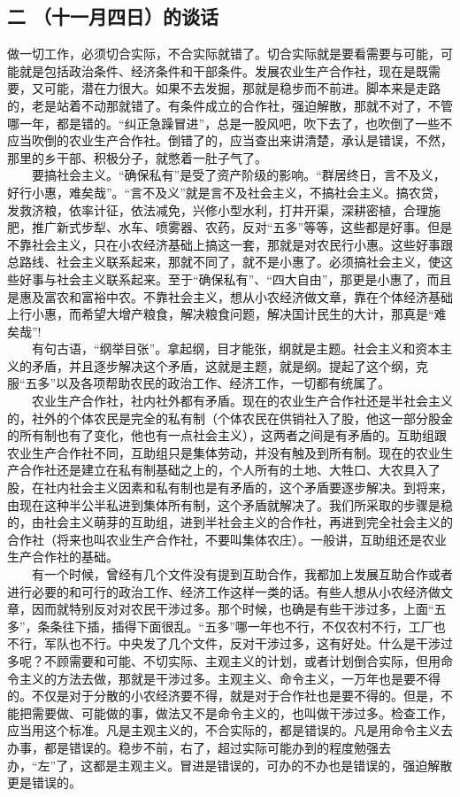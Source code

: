 \documentclass[cn,11pt,chinese]{elegantbook}
\def\myformat#1{\hfil\hfil #1}
\begin{document}
\subsection*{\myformat{二 （十一月四日）的谈话}}
做一切工作，必须切合实际，不合实际就错了。切合实际就是要看需要与可能，可能就是包括政治条件、经济条件和干部条件。发展农业生产合作社，现在是既需要，又可能，潜在力很大。如果不去发掘，那就是稳步而不前进。脚本来是走路的，老是站着不动那就错了。有条件成立的合作社，强迫解散，那就不对了，不管哪一年，都是错的。“纠正急躁冒进”，总是一股风吧，吹下去了，也吹倒了一些不应当吹倒的农业生产合作社。倒错了的，应当查出来讲清楚，承认是错误，不然，那里的乡干部、积极分子，就憋着一肚子气了。\\
　　要搞社会主义。“确保私有”是受了资产阶级的影响。“群居终日，言不及义，好行小惠，难矣哉”。“言不及义”就是言不及社会主义，不搞社会主义。搞农贷，发救济粮，依率计征，依法减免，兴修小型水利，打井开渠，深耕密植，合理施肥，推广新式步犁、水车、喷雾器、农药，反对“五多”等等，这些都是好事。但是不靠社会主义，只在小农经济基础上搞这一套，那就是对农民行小惠。这些好事跟总路线、社会主义联系起来，那就不同了，就不是小惠了。必须搞社会主义，使这些好事与社会主义联系起来。至于“确保私有”、“四大自由”，那更是小惠了，而且是惠及富农和富裕中农。不靠社会主义，想从小农经济做文章，靠在个体经济基础上行小惠，而希望大增产粮食，解决粮食问题，解决国计民生的大计，那真是“难矣哉”!\\
　　有句古语，“纲举目张”。拿起纲，目才能张，纲就是主题。社会主义和资本主义的矛盾，并且逐步解决这个矛盾，这就是主题，就是纲。提起了这个纲，克服“五多”以及各项帮助农民的政治工作、经济工作，一切都有统属了。\\
　　农业生产合作社，社内社外都有矛盾。现在的农业生产合作社还是半社会主义的，社外的个体农民是完全的私有制（个体农民在供销社入了股，他这一部分股金的所有制也有了变化，他也有一点社会主义），这两者之间是有矛盾的。互助组跟农业生产合作社不同，互助组只是集体劳动，并没有触及到所有制。现在的农业生产合作社还是建立在私有制基础之上的，个人所有的土地、大牲口、大农具入了股，在社内社会主义因素和私有制也是有矛盾的，这个矛盾要逐步解决。到将来，由现在这种半公半私进到集体所有制，这个矛盾就解决了。我们所采取的步骤是稳的，由社会主义萌芽的互助组，进到半社会主义的合作社，再进到完全社会主义的合作社（将来也叫农业生产合作社，不要叫集体农庄）。一般讲，互助组还是农业生产合作社的基础。\\
　　有一个时候，曾经有几个文件没有提到互助合作，我都加上发展互助合作或者进行必要的和可行的政治工作、经济工作这样一类的话。有些人想从小农经济做文章，因而就特别反对对农民干涉过多。那个时候，也确是有些干涉过多，上面“五多”，条条往下插，插得下面很乱。“五多”哪一年也不行，不仅农村不行，工厂也不行，军队也不行。中央发了几个文件，反对干涉过多，这有好处。什么是干涉过多呢？不顾需要和可能、不切实际、主观主义的计划，或者计划倒合实际，但用命令主义的方法去做，那就是干涉过多。主观主义、命令主义，一万年也是要不得的。不仅是对于分散的小农经济要不得，就是对于合作社也是要不得的。但是，不能把需要做、可能做的事，做法又不是命令主义的，也叫做干涉过多。检查工作，应当用这个标准。凡是主观主义的，不合实际的，都是错误的。凡是用命令主义去办事，都是错误的。稳步不前，右了，超过实际可能办到的程度勉强去办，“左”了，这都是主观主义。冒进是错误的，可办的不办也是错误的，强迫解散更是错误的。\\
\end{document}
